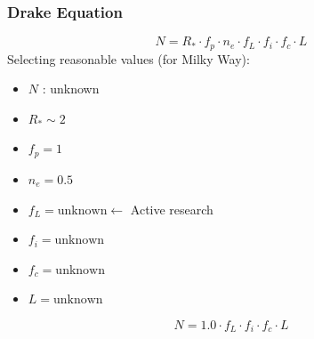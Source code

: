 \documentclass{beamer}
\begin{document}
\begin{frame}
\frametitle{Drake Equation}
$$ N = R_{*} \cdot f_{p} \cdot n_{e} \cdot f_{L} \cdot f_{i} \cdot f_{c} \cdot L$$
Selecting reasonable values (for Milky Way): 
\begin{itemize}
    \item $N$ : unknown
    \item $R_{*} \sim 2$
    \item $f_{p} = 1$
    \item $n_{e} = 0.5$ %
    \item $f_{L} = \text{unknown} \leftarrow $ Active research
    \item $f_{i} = \text{unknown}$
    \item $f_{c} = \text{unknown}$ 
    \item $L     = \text{unknown}$ 
\end{itemize}
\pause
$$ N = 1.0 \cdot f_{L} \cdot f_{i} \cdot f_{c} \cdot L$$
\end{frame}


\end{document}

